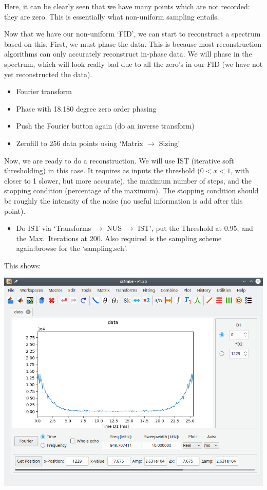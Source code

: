 \documentclass[11pt,a4paper]{article}
\begin{document}
Here, it can be clearly seen that we have many points which are not recorded:
they are zero. This is essentially what non-uniform sampling entails.

Now that we have our non-uniform `FID', we can start to reconstruct a spectrum
based on this. First, we must phase the data. This is because most
reconstruction algorithms can only accurately reconstruct in-phase data. We will
phase in the spectrum, which will look really bad due to all the zero's in our
FID (we have not yet reconstructed the data).
\begin{itemize}
  \item Fourier transform
  \item Phase with 18.180 degree zero order phasing
  \item Push the Fourier button again (do an inverse transform)
  \item Zerofill to 256 data points using `Matrix $\longrightarrow$ Sizing'
\end{itemize}
Now, we are ready to do a reconstruction. We will use IST (iterative soft
thresholding) in this case. It requires as inputs the threshold ($0 < x <1$, with
closer to 1 slower, but more accurate), the maximum number of steps, and the
stopping condition (percentage of the maximum). The stopping condition should
be roughly the intensity of the noise (no useful information is add after
this point).
\begin{itemize}
  \item Do IST via `Transforms $\longrightarrow$ NUS $\longrightarrow$ IST', put
	 the Threshold at 0.95, and the Max.\ Iterations at 200. Also required is the
	 sampling scheme again:browse for the `sampling.sch'.
\end{itemize}
This shows:
\begin{center}
\includegraphics[width=0.8\linewidth]{Figs/Fig4.png}
\end{center}
\end{document}
